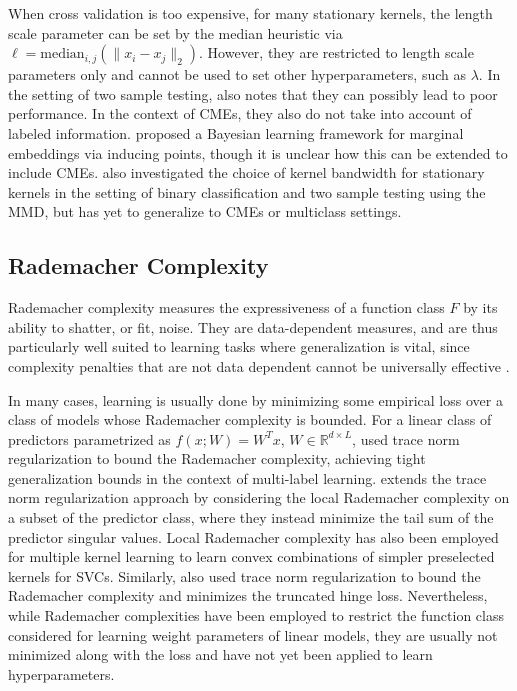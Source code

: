 \documentclass[twoside]{article}
\begin{document}
			When cross validation is too expensive, for many stationary kernels, the length scale parameter can be set by the median heuristic \citep{muandet2016kernel} via $\ell = \mathrm{median}_{i, j}(\| x_{i} - x_{j} \|_{2})$. However, they are restricted to length scale parameters only and cannot be used to set other hyperparameters, such as $\lambda$. In the setting of two sample testing, \cite{gretton2012optimal} also notes that they can possibly lead to poor performance. In the context of \glspl{CME}, they also do not take into account of labeled information. \cite{flaxman2016bayesian} proposed a Bayesian learning framework for marginal embeddings via inducing points, though it is unclear how this can be extended to include \glspl{CME}. \cite{fukumizu2009kernel} also investigated the choice of kernel bandwidth for stationary kernels in the setting of binary classification and two sample testing using the \gls{MMD}, but has yet to generalize to \glspl{CME} or multiclass settings.

		\subsection{Rademacher Complexity}
		
			Rademacher complexity \citep{bartlett2002rademacher} measures the expressiveness of a function class $F$ by its ability to shatter, or fit, noise. They are data-dependent measures, and are thus particularly well suited to learning tasks where generalization is vital, since complexity penalties that are not data dependent cannot be universally effective \citep{kearns1997experimental}. 
	
			In many cases, learning is usually done by minimizing some empirical loss over a class of models whose Rademacher complexity is bounded. For a linear class of predictors parametrized as $f(x; W) = W^{T} x$, $W \in \mathbb{R}^{d \times L}$, \cite{yu2014large} used trace norm regularization to bound the Rademacher complexity, achieving tight generalization bounds in the context of multi-label learning. \cite{xu2016local} extends the trace norm regularization approach by considering the local Rademacher complexity on a subset of the predictor class, where they instead minimize the tail sum of the predictor singular values. Local Rademacher complexity has also been employed for multiple kernel learning \citep{kloft2011local, cortes2013learning} to learn convex combinations of simpler preselected kernels for \glspl{SVC}. Similarly, \cite{pontil2013excess} also used trace norm regularization to bound the Rademacher complexity and minimizes the truncated hinge loss. Nevertheless, while Rademacher complexities have been employed to restrict the function class considered for learning weight parameters of linear models, they are usually not minimized along with the loss and have not yet been applied to learn hyperparameters.
	
\end{document}
